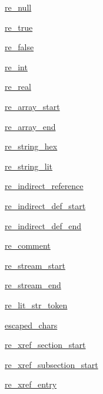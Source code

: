 \begin{DoxyCompactItemize}
\item 
\hyperlink{classPIL_1_1PdfParser_1_1PdfParser_aeb5aa8a9e23b758960912193ce4c61fd}{re\+\_\+null}
\item 
\hyperlink{classPIL_1_1PdfParser_1_1PdfParser_a483165931f9dff612dc545797ff2b343}{re\+\_\+true}
\item 
\hyperlink{classPIL_1_1PdfParser_1_1PdfParser_a1ba23f526a181977d96cce7b890fe521}{re\+\_\+false}
\item 
\hyperlink{classPIL_1_1PdfParser_1_1PdfParser_a77ba017700ff08cf4a053e0d236db72f}{re\+\_\+int}
\item 
\hyperlink{classPIL_1_1PdfParser_1_1PdfParser_a0c8aaa6e32fa89189134a26add8cad36}{re\+\_\+real}
\item 
\hyperlink{classPIL_1_1PdfParser_1_1PdfParser_a86cc114684e47cedec91b350d0b32ffc}{re\+\_\+array\+\_\+start}
\item 
\hyperlink{classPIL_1_1PdfParser_1_1PdfParser_a1ab6ab21730ed4343498b0e00fb39ac6}{re\+\_\+array\+\_\+end}
\item 
\hyperlink{classPIL_1_1PdfParser_1_1PdfParser_a1770b8c03a392cbaa142a1212d5602c9}{re\+\_\+string\+\_\+hex}
\item 
\hyperlink{classPIL_1_1PdfParser_1_1PdfParser_af652d4b79d0ca177fa7f0a435fd0698f}{re\+\_\+string\+\_\+lit}
\item 
\hyperlink{classPIL_1_1PdfParser_1_1PdfParser_ac98c0ae88ccd152a2970249700c359bd}{re\+\_\+indirect\+\_\+reference}
\item 
\hyperlink{classPIL_1_1PdfParser_1_1PdfParser_a9be7bb7304de88e8aefa284bf581ae89}{re\+\_\+indirect\+\_\+def\+\_\+start}
\item 
\hyperlink{classPIL_1_1PdfParser_1_1PdfParser_a8c8896788688f69647115b8e1a144360}{re\+\_\+indirect\+\_\+def\+\_\+end}
\item 
\hyperlink{classPIL_1_1PdfParser_1_1PdfParser_a6c84d294f7992e0432d8cd66c941862e}{re\+\_\+comment}
\item 
\hyperlink{classPIL_1_1PdfParser_1_1PdfParser_a3931dd53d323ea9f0153cfdcb1b70deb}{re\+\_\+stream\+\_\+start}
\item 
\hyperlink{classPIL_1_1PdfParser_1_1PdfParser_a328c32546684955699c4db9e71ffa716}{re\+\_\+stream\+\_\+end}
\item 
\hyperlink{classPIL_1_1PdfParser_1_1PdfParser_a9d6315b655723f055b7b020ca0acf4c5}{re\+\_\+lit\+\_\+str\+\_\+token}
\item 
\hyperlink{classPIL_1_1PdfParser_1_1PdfParser_a3e3cf80ba2152f7cdfbb91de7f56e68d}{escaped\+\_\+chars}
\item 
\hyperlink{classPIL_1_1PdfParser_1_1PdfParser_ac09e7961e25aeccc3a0334d35d980fe5}{re\+\_\+xref\+\_\+section\+\_\+start}
\item 
\hyperlink{classPIL_1_1PdfParser_1_1PdfParser_a65771bd325458de8e1bf7f51bd2d24ff}{re\+\_\+xref\+\_\+subsection\+\_\+start}
\item 
\hyperlink{classPIL_1_1PdfParser_1_1PdfParser_adbcfcf8ed2cb007224c4f34ed14de955}{re\+\_\+xref\+\_\+entry}
\end{DoxyCompactItemize}


